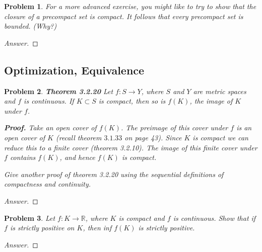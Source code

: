 \documentclass{article}
\newtheorem{problem}{Problem}[section]
\begin{document}
\begin{problem} For a more advanced exercise, you might like to try to show that the closure of a precompact set is compact. It follows that every precompact set is bounded. (Why?)
\end{problem}

\begin{proof}[Answer]
    
\end{proof}

\subsection{Optimization, Equivalence}

\begin{problem}
   \textbf{Theorem 3.2.20}
    Let $f: S \rightarrow Y$, where $S$ and $Y$ are metric spaces and $f$ is continuous. If $K \subset S$ is compact, then so is $f(K)$, the image of $K$ under $f$.
    
    \textbf{Proof.} Take an open cover of $f(K)$. The preimage of this cover under $f$ is an open cover of $K$ (recall theorem $3.1 .33$ on page 43). Since $K$ is compact we can reduce this to a finite cover (theorem 3.2.10). The image of this finite cover under $f$ contains $f(K)$, and hence $f(K)$ is compact.

    Give another proof of theorem 3.2.20 using the sequential definitions
of compactness and continuity.

\end{problem}
\begin{proof}[Answer]
    
\end{proof}


\begin{problem}Let $f: K \rightarrow \mathbb{R}$, where $K$ is compact and $f$ is continuous. Show that if $f$ is strictly positive on $K$, then inf $f(K)$ is strictly positive.

\end{problem}
\begin{proof}[Answer]
    
\end{proof}
\end{document}
